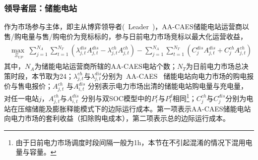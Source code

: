 \subsubsection{领导者层：储能电站}
作为市场参与主体，即主从博弈领导者(~Leader~)，AA-CAES储能电站运营商以售/购电量与售/购电价为竞标标的，参与日前电力市场竞标以最大化运营收益，
\begin{eqnarray}
\label{equ:aa-caes-pab-leader-obj}
\begin{array}{l}
\mathop {\max \;}\limits_{{\Xi _{UP}}} \sum\limits_{j = 1}^{{N_A}} {\sum\limits_{t = 1}^{{N_T}} {({\lambda _{j,t}^{dis}A_{j,t}^{dis} - \lambda _{j,t}^{ch}A_{j,t}^{ch}})} } - \sum\limits_{j = 1}^{{N_A}} {\sum\limits_{t = 1}^{{N_T}} {({C_j^{dis}A_{j,t}^{dis} + C_j^{ch}A_{j,t}^{ch}})} }
\end{array}
\end{eqnarray}
其中，$N_A$为储能电站运营商所辖的AA-CAES电站个数；$N_T$为日前电力市场总决策时段，本节取为24；$\lambda _{j,t}^{ch}$与$\lambda _{j,t}^{dis}$分别为~AA-CAES~ 储能电站向电力市场的购电报价与售电报价；$A_{j,t}^{ch}$ 与$A_{i,t}^{dis}$ 分别表示电力市场出清的储能电站购电量与充电量，对任一电站$j$，$A_{j,t}^{ch}$与$A_{i,t}^{dis}$ 分别与双SOC模型中的$P_t^c$与$P_t^d$相同\footnote{由于日前电力市场调度时段间隔一般为1h，本节在不引起混淆的情况下混用电量与容量。}；$C_j^{ch}$与$C_j^{dis}$分别为电站在压缩储能及膨胀释能模式下的边际运行成本。第一项表示AA-CAES储能电站向电力市场的套利收益（扣除购电成本），第二项表示总的边际运行成本。

